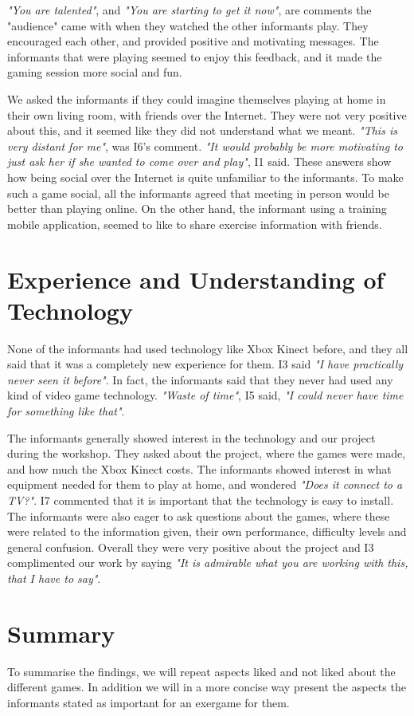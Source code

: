 \emph{"You are talented"}, and \emph{"You are starting to get it now"}, are comments the "audience" came with when they watched the other informants play. They encouraged each other, and provided positive and motivating messages. The informants that were playing seemed to enjoy this feedback, and it made the gaming session more social and fun.  

We asked the informants if they could imagine themselves playing at home in their own living room, with friends over the Internet. They were not very positive about this, and it seemed like they did not understand what we meant. \emph{"This is very distant for me"}, was I6's comment. \emph{"It would probably be more motivating to just ask her if she wanted to come over and play"}, I1 said. These answers show how being social over the Internet is quite unfamiliar to the informants. To make such a game social, all the informants agreed that meeting in person would be better than playing online. On the other hand, the informant using a training mobile application, seemed to like to share exercise information with friends.

\section{Experience and Understanding of Technology}
None of the informants had used technology like Xbox Kinect before, and they all said that it was a completely new experience for them. I3 said \emph{"I have practically never seen it before"}. In fact, the informants said that they never had used any kind of video game technology. \emph{"Waste of time"}, I5 said, \emph{"I could never have time for something like that"}.  

The informants generally showed interest in the technology and our project during the workshop. They asked about the project, where the games were made, and how much the Xbox Kinect costs. The informants showed interest in what equipment needed for them to play at home, and wondered \emph{"Does it connect to a TV?"}. I7 commented that it is important that the technology is easy to install. The informants were also eager to ask questions about the games, where these were related to the information given, their own performance, difficulty levels and general confusion. Overall they were very positive about the project and I3 complimented our work by saying \emph{"It is admirable what you are working with this, that I have to say"}. 

\section{Summary}
To summarise the findings, we will repeat aspects liked and not liked about the different games. In addition we will in a more concise way present the aspects the informants stated as important for an exergame for them. 

